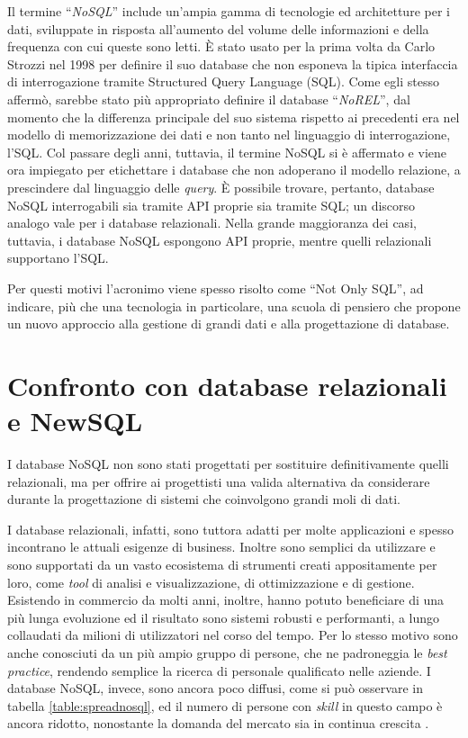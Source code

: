 Il termine ``\textit{NoSQL}'' include un’ampia gamma di tecnologie ed architetture per i dati, sviluppate in risposta all’aumento del volume delle informazioni e della frequenza con cui queste
sono letti. È stato usato per la prima volta da Carlo Strozzi nel 1998 \cite{nosqlorig} per definire il suo database che non esponeva la tipica interfaccia di interrogazione tramite Structured 
Query Language (SQL). Come egli stesso affermò, sarebbe stato più appropriato definire il database ``\textit{NoREL}'', dal momento che la differenza principale del suo sistema rispetto ai 
precedenti era nel modello di memorizzazione dei dati e non tanto nel linguaggio di interrogazione, l’SQL. Col passare degli anni, tuttavia, il termine NoSQL si è affermato e 
viene ora impiegato per etichettare i database che non adoperano il modello relazione, a prescindere dal linguaggio delle \textit{query}. È possibile trovare, pertanto, database NoSQL 
interrogabili sia tramite API proprie sia tramite SQL; un discorso analogo vale per i database relazionali. Nella grande maggioranza dei casi, tuttavia, i database NoSQL espongono 
API proprie, mentre quelli relazionali supportano l’SQL.

Per questi motivi l’acronimo viene spesso risolto come ``Not Only SQL'', ad indicare, più che una tecnologia in particolare, una scuola di pensiero che propone un nuovo approccio 
alla gestione di grandi dati e alla progettazione di database.


\section{Confronto con database relazionali e NewSQL}

I database NoSQL non sono stati progettati per sostituire definitivamente quelli relazionali, ma per offrire ai progettisti una valida alternativa da considerare durante la 
progettazione di sistemi che coinvolgono grandi moli di dati.

I database relazionali, infatti, sono tuttora adatti per molte applicazioni e spesso incontrano le attuali esigenze di business. Inoltre sono semplici da utilizzare e sono 
supportati da un vasto ecosistema di strumenti creati appositamente per loro, come \textit{tool} di analisi e visualizzazione, di ottimizzazione e di gestione. Esistendo in commercio 
da molti anni, inoltre, hanno potuto beneficiare di una più lunga evoluzione ed il risultato sono sistemi robusti e performanti, a lungo collaudati da milioni di utilizzatori 
nel corso del tempo. Per lo stesso motivo sono anche conosciuti da un più ampio gruppo di persone, che ne padroneggia le \textit{best practice}, rendendo semplice la ricerca di personale 
qualificato nelle aziende. I database NoSQL, invece, sono ancora poco diffusi, come si può osservare in tabella \ref{table:spreadnosql}, ed il numero di persone con \textit{skill} 
in questo campo è ancora ridotto, nonostante la domanda del mercato sia in continua crescita \cite{URL:nosqltrend}.

